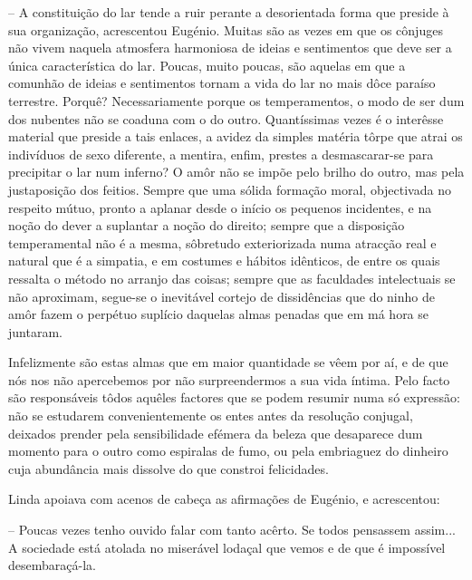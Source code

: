 \documentclass[9pt]{article}
\begin{document}
-- A constitui\-ção do lar tende a ruir perante a desorientada forma que preside à sua organiza\-ção, acrescentou Eugé\-nio. Muitas são as
vezes em que os cônjuges não vivem naquela atmosfera harmoniosa de
ideias e sentimentos que deve ser a única característica do lar. Poucas, muito poucas, são aquelas em que a comunhão de ideias e sentimentos tornam a vida do lar no mais dôce paraíso terrestre. Porquê? Necessariamente porque os temperamentos, o modo de ser dum dos nubentes
não se coaduna com o do outro. Quantíssimas vezes é o interêsse material que preside a tais enlaces, a avidez da simples ma\-té\-ria tôrpe
que atrai os indivíduos de sexo diferente, a mentira, enfim, prestes a
desmascarar-se para precipitar o lar num inferno? O amôr não se impõe
pelo bri\-lho do outro, mas pela justaposi\-ção dos feitios. Sempre que
uma sólida forma\-ção moral, objectivada no respeito mútuo, pronto a aplanar desde o início os pequenos incidentes, e na no\-ção do dever a suplantar a no\-ção do direito; sempre que a disposi\-ção temperamental não é
a mesma, sôbretudo exteriorizada numa atrac\-ção real e natural que é
a simpatia, e em costumes e hábitos idênticos, de entre os quais ressalta o método no arranjo das coisas; sempre que as faculdades intelectuais se não aproximam, segue-se o inevitável cortejo de dissidên\-cias
que do ninho de amôr fazem o perpétuo suplício daquelas almas penadas
que em má hora se juntaram.

Infelizmente são estas almas que em maior quantidade se vêem
por aí, e de que nós nos não apercebemos por não surpreendermos a sua
vida íntima. Pelo facto são responsáveis tôdos a\-quê\-les factores que
se podem resumir numa só ex\-pres\-são: não se estudarem convenientemente os entes antes da resolu\-ção conjugal, deixados prender pela sensibilidade efémera da beleza que desaparece dum momento para o outro
como espiralas de fumo, ou pela embriaguez do dinheiro cuja abundância
mais dissolve do que constroi felicidades.

Linda apoiava com acenos de cabeça as afirma\-ções de Eugé\-nio, e
acrescentou:

-- Poucas vezes tenho ouvido falar com tanto acêrto. Se todos pensassem assim... A sociedade está atolada no miserável lodaçal que
vemos e de que é impossível desembaraçá-la.
\end{document}
